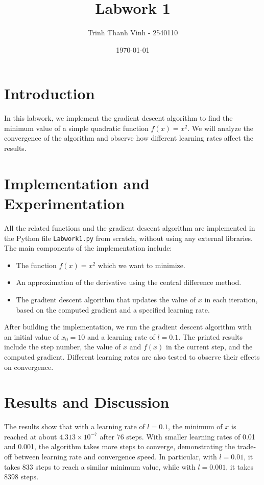 \documentclass[12pt]{article}
\title{Labwork 1}
\author{Trinh Thanh Vinh - 2540110}
\date{\today}
\begin{document}
\maketitle

\section{Introduction}
In this labwork, we implement the gradient descent algorithm to find the minimum value of a simple quadratic function \( f(x) = x^2 \). We will analyze the convergence of the algorithm and observe how different learning rates affect the results.

\section{Implementation and Experimentation}
All the related functions and the gradient descent algorithm are implemented in the Python file \texttt{Labwork1.py} from scratch, without using any external libraries. The main components of the implementation include:
\begin{itemize}
    \item The function \( f(x) = x^2 \) which we want to minimize.
    \item An approximation of the derivative using the central difference method.
    \item The gradient descent algorithm that updates the value of \( x \) in each iteration, based on the computed gradient and a specified learning rate.
\end{itemize}

After building the implementation, we run the gradient descent algorithm with an initial value of \( x_0 = 10 \) and a learning rate of \( l = 0.1 \). The printed results include the step number, the value of \( x \) and \( f(x) \) in the current step, and the computed gradient. Different learning rates are also tested to observe their effects on convergence.

\section{Results and Discussion}

The results show that with a learning rate of \( l = 0.1 \), the minimum of \(x\) is reached at about $4.313 \times 10^{-7}$ after 76 steps. With smaller learning rates of 0.01 and 0.001, the algorithm takes more steps to converge, demonstrating the trade-off between learning rate and convergence speed. In particular, with \( l = 0.01 \), it takes 833 steps to reach a similar minimum value, while with \( l = 0.001 \), it takes 8398 steps.
\end{document}
